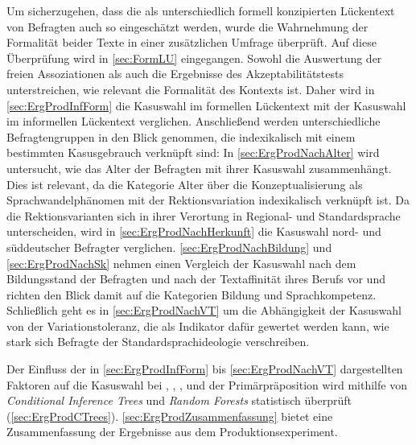 Um sicherzugehen, dass die als unterschiedlich formell konzipierten Lückentext von Befragten auch so eingeschätzt werden, wurde die Wahrnehmung der Formalität beider Texte in einer zusätzlichen Umfrage überprüft. 
Auf diese Überprüfung wird in \autoref{sec:FormLU} eingegangen. 
Sowohl die Auswertung der freien Assoziationen als auch die Ergebnisse des Akzeptabilitätstests unterstreichen, wie relevant die Formalität des Kontexts ist. Daher wird in \autoref{sec:ErgProdInfForm} die Kasuswahl im formellen Lückentext mit der Kasuswahl im informellen Lückentext verglichen. 
Anschließend werden unterschiedliche Befragtengruppen in den Blick genommen, die indexikalisch mit einem bestimmten Kasusgebrauch verknüpft sind:
In \autoref{sec:ErgProdNachAlter} wird untersucht, wie das Alter der Befragten mit ihrer Kasuswahl zusammenhängt.
Dies ist relevant, da die Kategorie \glqq Alter\grqq{} über die Konzeptualisierung als Sprachwandelphänomen mit der Rektionsvariation indexikalisch verknüpft ist. 
Da die Rektionsvarianten sich in ihrer Verortung in Regional- und Standardsprache unterscheiden, wird in \autoref{sec:ErgProdNachHerkunft} die Kasuswahl nord- und süddeutscher Befragter verglichen. 
\autoref{sec:ErgProdNachBildung} und \autoref{sec:ErgProdNachSk} nehmen einen Vergleich der Kasuswahl nach dem Bildungsstand der Befragten und nach der Textaffinität ihres Berufs vor und richten den Blick damit auf die {Ka\-te\-gorien} \glqq Bildung\grqq{} und \glqq Sprachkompetenz\grqq.
Schließlich geht es in \autoref{sec:ErgProdNachVT} um die Abhängigkeit der Kasuswahl von der Variationstoleranz, die als Indikator dafür gewertet werden kann, wie stark sich Befragte der Standardsprachideologie verschreiben. 

Der Einfluss der in \autoref{sec:ErgProdInfForm} bis \autoref{sec:ErgProdNachVT} dargestellten Faktoren auf die Kasuswahl bei \wegen, \waehrend, \dank, \gegenueber{} und der Primärpräposition  wird mithilfe von \textit{Conditional Inference Trees} und \textit{Random Forests} statistisch überprüft (\autoref{sec:ErgProdCTrees}). 
\autoref{sec:ErgProdZusammenfassung} bietet eine Zusammenfassung der Ergebnisse aus dem Produktionsexperiment. 
